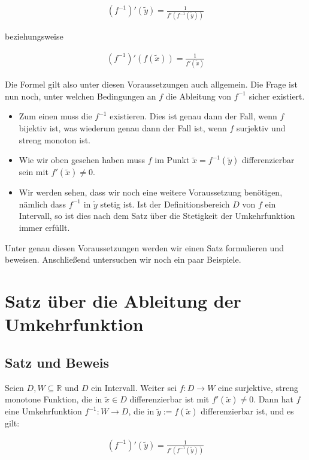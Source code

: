 \documentclass[fontsize=9pt,
               parskip=half-,
               DIV=14,
               listof=chapterentry,
               tocflat]{scrbook}
\begin{document}
\begin{align*}
(f^{-1})'({\tilde {y}})={\frac {1}{f'(f^{-1}({\tilde {y}}))}}
\end{align*}

beziehungsweise

\begin{align*}
(f^{-1})'(f({\tilde {x}}))={\frac {1}{f'({\tilde {x}})}}
\end{align*}

Die Formel gilt also unter diesen Voraussetzungen auch allgemein. Die Frage ist nun noch, unter welchen Bedingungen an $f$ die Ableitung von $f^{-1}$ sicher existiert.

\begin{itemize}
\item Zum einen muss die $f^{-1}$ existieren. Dies ist genau dann der Fall, wenn $f$ bijektiv ist, was wiederum genau dann der Fall ist, wenn $f$ surjektiv und streng monoton ist.
\item Wie wir oben gesehen haben muss $f$ im Punkt ${\tilde {x}}=f^{-1}({\tilde {y}})$ differenzierbar sein mit $f'({\tilde {x}})\neq 0$.
\item Wir werden sehen, dass wir noch eine weitere Voraussetzung benötigen, nämlich dass $f^{-1}$ in ${\tilde {y}}$ stetig ist. Ist der Definitionsbereich $D$ von $f$ ein Intervall, so ist dies nach dem Satz über die Stetigkeit der Umkehrfunktion immer erfüllt.
\end{itemize}

Unter genau diesen Voraussetzungen werden wir einen Satz formulieren und beweisen. Anschließend untersuchen wir noch ein paar Beispiele.

\section{Satz über die Ableitung der Umkehrfunktion}

\subsection{Satz und Beweis}

\begin{theorem*}
Seien $D,W\subseteq \mathbb {R} $ und $D$ ein Intervall. Weiter sei $f:D\to W$ eine surjektive, streng monotone Funktion, die in ${\tilde {x}}\in D$ differenzierbar ist mit $f'({\tilde {x}})\neq 0$. Dann hat $f$ eine Umkehrfunktion $f^{-1}:W\to D$, die in ${\tilde {y}}:=f({\tilde {x}})$ differenzierbar ist, und es gilt:

\begin{align*}
(f^{-1})'({\tilde {y}})={\frac {1}{f'(f^{-1}({\tilde {y}}))}}
\end{align*}

\end{theorem*}
\end{document}
